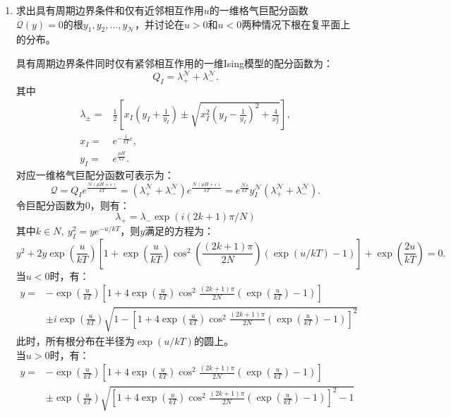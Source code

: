 \documentclass[reqno,a4paper,12pt]{amsart}
\begin{document}
\begin{enumerate}[1.]
\item 求出具有周期边界条件和仅有近邻相互作用$u$的一维格气巨配分函数$\mathcal{Q}(y) = 0$的根$y_1,y_2,\dots,y_{\mathcal{N}}$，并讨论在$u>0$和$u<0$两种情况下根在复平面上的分布。
\begin{tcolorbox}[breakable, colframe = black, colback = black!5!white]
具有周期边界条件同时仅有紧邻相互作用的一维Ising模型的配分函数为：
\[
	Q_I = \lambda_+^{\mathcal{N}} + \lambda_-^{\mathcal{N}}.
\]
其中
\begin{align*}
	\lambda_\pm =& \frac{1}{2}\left[ x_I\left( y_I+\frac{1}{y_I} \right) \pm \sqrt{x_I^2\left( y_I - \frac{1}{y_I} \right)^2 + \frac{4}{x_I^2}} \right], \\
	x_I =& e^{-\frac{1}{kT}\varepsilon}, \\
	y_I =& e^{\frac{\mu H}{kT}}.
\end{align*}
对应一维格气巨配分函数可表示为：
\[
	\mathcal{Q} = Q_I e^{\frac{\mathcal{N}(\mu H+\varepsilon)}{kT}} = (\lambda_+^\mathcal{N} + \lambda_-^\mathcal{N}) e^{\frac{\mathcal{N}(\mu H+\varepsilon)}{kT}} = e^{\frac{\mathcal{N}\varepsilon}{kT}} y_I^\mathcal{N}(\lambda_+^\mathcal{N} + \lambda_-^\mathcal{N}).
\]
令巨配分函数为0，则有：
\[
	\lambda_+ = \lambda_- \exp\left( i(2k+1)\pi/N \right)
\]
其中$k \in N,~y_I^2 = ye^{-u/kT}$，则$y$满足的方程为：
\[
	y^2 + 2y\exp\left( \frac{u}{kT} \right)\left[ 1+\exp\left( \frac{u}{kT} \right) \cos^2\left( \frac{(2k+1)\pi}{2N} \right) \left( \exp(u/kT)-1 \right) \right] + \exp\left( \frac{2u}{kT} \right) = 0.
\]
当$u<0$时，有：
\begin{align*}
	y =& -\exp\left( \frac{u}{kT} \right)\left[ 1 + 4\exp\left( \frac{u}{kT} \right) \cos^2\frac{(2k+1)\pi}{2N} \left( \exp\left( \frac{u}{kT} \right) - 1 \right) \right] \\
	&\pm i \exp\left( \frac{u}{kT} \right) \sqrt{1 - \left[ 1+4\exp\left( \frac{u}{kT} \right) \cos^2\frac{(2k+1)\pi}{2N} \left( \exp\left( \frac{u}{kT} \right) - 1 \right) \right]^2}
\end{align*}
此时，所有根分布在半径为$\exp(u/kT)$的圆上。 \\
当$u>0$时，有：
\begin{align*}
	y =& -\exp\left( \frac{u}{kT} \right)\left[ 1 + 4\exp\left( \frac{u}{kT} \right) \cos^2\frac{(2k+1)\pi}{2N} \left( \exp\left( \frac{u}{kT} \right) - 1 \right) \right] \\
	&\pm \exp\left( \frac{u}{kT} \right) \sqrt{\left[ 1+4\exp\left( \frac{u}{kT} \right) \cos^2\frac{(2k+1)\pi}{2N} \left( \exp\left( \frac{u}{kT} \right) - 1 \right) \right]^2 - 1}
\end{align*}
\end{tcolorbox}


\end{enumerate}
\end{document}
